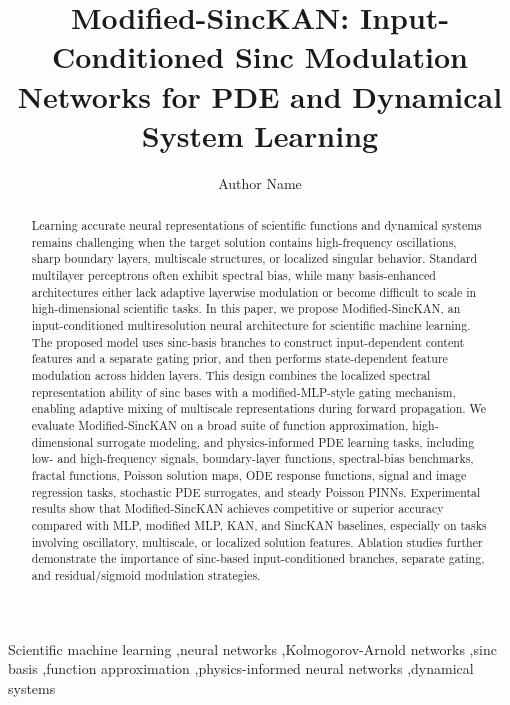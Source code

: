 \documentclass[preprint,12pt]{elsarticle}
\begin{document}
\begin{frontmatter}

\title{Modified-SincKAN: Input-Conditioned Sinc Modulation Networks for PDE and Dynamical System Learning}

\author[inst1]{Author Name}


\begin{abstract}
Learning accurate neural representations of scientific functions and dynamical systems remains challenging when the target solution contains high-frequency oscillations, sharp boundary layers, multiscale structures, or localized singular behavior. Standard multilayer perceptrons often exhibit spectral bias, while many basis-enhanced architectures either lack adaptive layerwise modulation or become difficult to scale in high-dimensional scientific tasks. In this paper, we propose Modified-SincKAN, an input-conditioned multiresolution neural architecture for scientific machine learning. The proposed model uses sinc-basis branches to construct input-dependent content features and a separate gating prior, and then performs state-dependent feature modulation across hidden layers. This design combines the localized spectral representation ability of sinc bases with a modified-MLP-style gating mechanism, enabling adaptive mixing of multiscale representations during forward propagation. We evaluate Modified-SincKAN on a broad suite of function approximation, high-dimensional surrogate modeling, and physics-informed PDE learning tasks, including low- and high-frequency signals, boundary-layer functions, spectral-bias benchmarks, fractal functions, Poisson solution maps, ODE response functions, signal and image regression tasks, stochastic PDE surrogates, and steady Poisson PINNs. Experimental results show that Modified-SincKAN achieves competitive or superior accuracy compared with MLP, modified MLP, KAN, and SincKAN baselines, especially on tasks involving oscillatory, multiscale, or localized solution features. Ablation studies further demonstrate the importance of sinc-based input-conditioned branches, separate gating, and residual/sigmoid modulation strategies.
\end{abstract}

\begin{keyword}
Scientific machine learning \sep neural networks \sep Kolmogorov-Arnold networks \sep sinc basis \sep function approximation \sep physics-informed neural networks \sep dynamical systems
\end{keyword}

\end{frontmatter}
\end{document}
